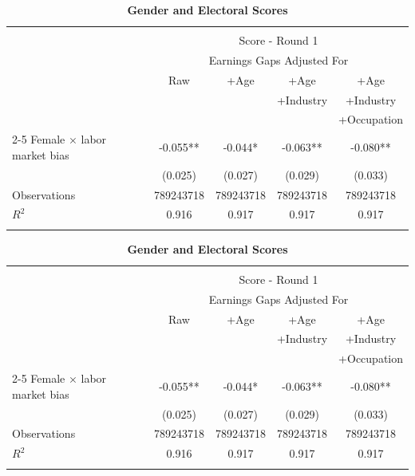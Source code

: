 \begin{table} \caption{\bf Gender and Electoral Scores }\begin{footnotesize}         \begin{center} \begin{tabular}{l*{4}{c}}\hline\hline \addlinespace \\ &\multicolumn{4}{c}{Score - Round 1} \\&\multicolumn{4}{c}{Earnings Gaps Adjusted For}&\\  &Raw&+Age&+Age&+Age\\&&&+Industry&+Industry\\&&&&+Occupation\\\cmidrule(lr){2-5}
Female $\times$ labor market bias&      -0.055** &      -0.044*  &      -0.063** &      -0.080** \\
                    &     (0.025)   &     (0.027)   &     (0.029)   &     (0.033)   \\
Observations        &   789243718   &   789243718   &   789243718   &   789243718   \\
\(R^{2}\)           &       0.916   &       0.917   &       0.917   &       0.917   \\
\addlinespace
\\
\hline
\hline
\end{tabular} \end{center} \end{footnotesize} \end{table}
\begin{table} \caption{\bf Gender and Electoral Scores }\begin{footnotesize}         \begin{center} \begin{tabular}{l*{4}{c}}\hline\hline \addlinespace \\ &\multicolumn{4}{c}{Score - Round 1} \\&\multicolumn{4}{c}{Earnings Gaps Adjusted For}&\\  &Raw&+Age&+Age&+Age\\&&&+Industry&+Industry\\&&&&+Occupation\\\cmidrule(lr){2-5}
Female $\times$ labor market bias&      -0.055** &      -0.044*  &      -0.063** &      -0.080** \\
                    &     (0.025)   &     (0.027)   &     (0.029)   &     (0.033)   \\
Observations        &   789243718   &   789243718   &   789243718   &   789243718   \\
\(R^{2}\)           &       0.916   &       0.917   &       0.917   &       0.917   \\
\addlinespace
\\
\hline
\hline
\end{tabular} \end{center} \end{footnotesize} \end{table}
